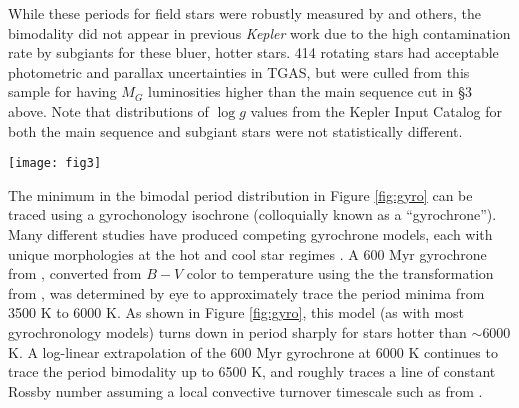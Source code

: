 \documentclass[manuscript, letterpaper]{aastex6}
\newcommand{\Kepler}{\textsl{Kepler}\xspace}
\begin{document}
While these periods for field stars were robustly measured by \citet{mcquillan2014} and others, the bimodality did not appear in previous \Kepler work due to the high contamination rate by subgiants for these bluer, hotter stars.  414 rotating stars had acceptable photometric and parallax uncertainties in TGAS, but were culled from this sample for having $M_G$ luminosities higher than the main sequence cut in \S3 above. Note that distributions of $\log g$ values from the Kepler Input Catalog \citep{brown2011a} for both the main sequence and subgiant stars were not statistically different.


\begin{figure*}[]
\centering
\texttt{[image: fig3]}
\caption{ Rotation period versus temperature for TGAS-matched stars near the isochrone main sequence (blue circles). 
The full \Kepler--Gaia matched sample is shown for reference (small black dots). A bimodality in rotation periods initially discovered for M dwarfs by \citet{mcquillan2013}, extends the full range of temperatures in the \Kepler--Gaia main sequence sample shown here.
A \citet{meibom2011} 600 Myr gyrochonology-isochrone (gyrochrone) traces the bimodality midpoint up to 6000 K (red solid line), but deviates from the isochrone sharply to $\sim$6200 K (red dotted line). A log-linear extrapolation of the isochrone at 6000K to 6500 K (red dashed line) continues to track the bimodality to hotter temperatures, and roughly follows a line of constant Rossby number. 
}
\label{fig:gyro}
\end{figure*}



The minimum in the bimodal period distribution in Figure \ref{fig:gyro} can be traced using a gyrochonology isochrone (colloquially known as a ``gyrochrone'').  Many different studies have produced competing gyrochrone models, each with unique morphologies at the hot and cool star regimes \citep[e.g.][]{barnes2007,mamajek2008,meibom2011,angus2015}. A 600 Myr gyrochrone from \citet{meibom2011}, converted from $B-V$ color to temperature using the the transformation from \citet{sekiguchi2000}, was determined by eye to approximately trace the period minima from 3500 K to 6000 K. As shown in Figure \ref{fig:gyro}, this model (as with most gyrochronology models) turns down in period sharply for stars hotter than $\sim$6000 K. A log-linear extrapolation of the 600 Myr gyrochrone at 6000 K continues to trace the period bimodality up to 6500 K, and roughly traces a line of constant Rossby number assuming a local convective turnover timescale such as from \citet{barneskim2010}. 
\end{document}
